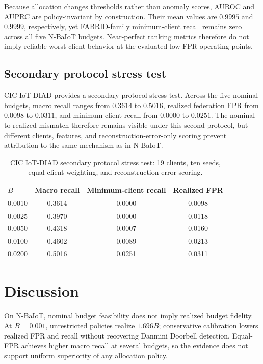 \documentclass[pdflatex,sn-mathphys-num]{sn-jnl}
\begin{document}
Because allocation changes thresholds rather than anomaly scores, AUROC and AUPRC are policy-invariant by construction. Their mean values are $0.9995$ and $0.9999$, respectively, yet FABRID-family minimum-client recall remains zero across all five N-BaIoT budgets. Near-perfect ranking metrics therefore do not imply reliable worst-client behavior at the evaluated low-FPR operating points.

\subsection{Secondary protocol stress test}
CIC IoT-DIAD provides a secondary protocol stress test. Across the five nominal budgets, macro recall ranges from $0.3614$ to $0.5016$, realized federation FPR from $0.0098$ to $0.0311$, and minimum-client recall from $0.0000$ to $0.0251$. The nominal-to-realized mismatch therefore remains visible under this second protocol, but different clients, features, and reconstruction-error-only scoring prevent attribution to the same mechanism as in N-BaIoT.

\begin{table}[!t]
\caption{CIC IoT-DIAD secondary protocol stress test: 19 clients, ten seeds, equal-client weighting, and reconstruction-error scoring.}
\label{tab:external}
\centering
\renewcommand{\arraystretch}{1.00}
\begin{tabular*}{0.82\textwidth}{@{\extracolsep{\fill}}lccc@{}}
\toprule
$B$ & Macro recall & Minimum-client recall & Realized FPR\\
\midrule
0.0010 & 0.3614 & 0.0000 & 0.0098\\
0.0025 & 0.3970 & 0.0000 & 0.0118\\
0.0050 & 0.4318 & 0.0007 & 0.0160\\
0.0100 & 0.4602 & 0.0089 & 0.0213\\
0.0200 & 0.5016 & 0.0251 & 0.0311\\
\bottomrule
\end{tabular*}
\end{table}

\section{Discussion}\label{sec:discussion}
On N-BaIoT, nominal budget feasibility does not imply realized budget fidelity. At $B=0.001$, unrestricted policies realize $1.696B$; conservative calibration lowers realized FPR and recall without recovering Danmini Doorbell detection. Equal-FPR achieves higher macro recall at several budgets, so the evidence does not support uniform superiority of any allocation policy.
\end{document}
